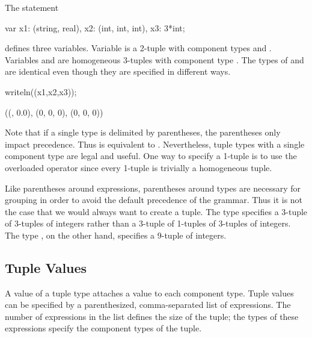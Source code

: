 \begin{example}
\begin{chapelpre}
\end{chapelpre}
The statement
\begin{chapel}
var x1: (string, real),
    x2: (int, int, int),
    x3: 3*int;
\end{chapel}
defines three variables.  Variable  is a 2-tuple with
component types  and .  Variables 
and  are homogeneous 3-tuples with component type .
The types of  and  are identical even though they
are specified in different ways.
\begin{chapelpost}
writeln((x1,x2,x3));
\end{chapelpost}
\begin{chapeloutput}
((, 0.0), (0, 0, 0), (0, 0, 0))
\end{chapeloutput}
\end{example}

Note that if a single type is delimited by parentheses, the
parentheses only impact precedence.  Thus  is equivalent
to .  Nevertheless, tuple types with a single component type
are legal and useful.  One way to specify a 1-tuple is to use the
overloaded \chpl{*} operator since every 1-tuple is trivially a
homogeneous tuple.

\begin{rationale}
Like parentheses around expressions, parentheses around types are
necessary for grouping in order to avoid the default precedence of the
grammar.  Thus it is not the case that we would always want to create
a tuple.  The type  specifies a 3-tuple of 3-tuples of
integers rather than a 3-tuple of 1-tuples of 3-tuples of integers.
The type , on the other hand, specifies a 9-tuple of
integers.
\end{rationale}

\subsection{Tuple Values}
\label{Tuple_Values}

A value of a tuple type attaches a value to each component type.
Tuple values can be specified by a parenthesized, comma-separated list
of expressions.  The number of expressions in the list defines the
size of the tuple; the types of these expressions specify the
component types of the tuple.

